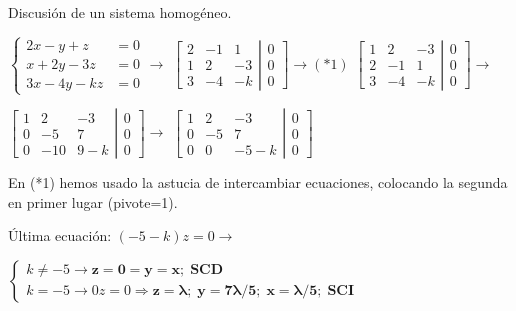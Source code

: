 \begin{ejem} Discusión de un sistema homogéneo.

$\begin{cases}2x-y+z&=0\\x+2y-3z&=0\\3x-4y-kz&=0\end{cases} \to $
$\left[ \begin{matrix}
  2 & -1 & 1 \\ 1 & 2 & -3 \\ 3 & -4 & -k 
 \end{matrix}\right. 
 \left| \begin{matrix}
  0 \\ 0 \\ 0 
 \end{matrix}\right] \to (*1) $
 $\left[ \begin{matrix}
  1 & 2 & -3 \\ 2 & -1 & 1 \\ 3 & -4 & -k 
 \end{matrix}\right. 
 \left| \begin{matrix}
  0 \\ 0 \\ 0 
 \end{matrix}\right] \to $
 
 
$\left[ \begin{matrix}
  1 & 2 & -3 \\ 0 & -5 & 7 \\ 0 & -10 & 9-k 
 \end{matrix}\right. 
 \left| \begin{matrix}
  0 \\ 0 \\ 0 
 \end{matrix}\right] \to $
 $\left[ \begin{matrix}
  1 & 2 & -3 \\ 0 & -5 & 7 \\ 0 & 0 & -5-k 
 \end{matrix}\right. 
 \left| \begin{matrix}
  0 \\ 0 \\ 0 
 \end{matrix}\right]$
 
 En (*1) hemos usado la astucia de intercambiar ecuaciones, colocando la segunda en primer lugar (pivote=1).
 
 Última ecuación: $(-5-k)z=0 \to$
 
 $ \begin{cases} k \neq -5 \to \boldsymbol{ z=0=y=x; \; SCD }\\ k=-5 \to 0z=0 \Rightarrow \boldsymbol{ z=\lambda;\; y=7\lambda /5;\;  x=\lambda /5; \; SCI}
 	\end{cases}$

\end{ejem}

